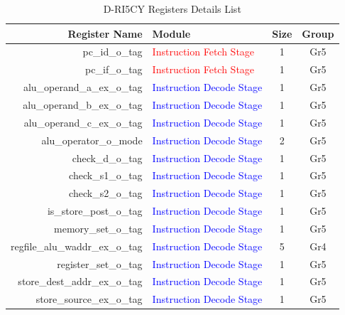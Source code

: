 \begin{table}
    \centering
    \small
    \caption{D-RI5CY Registers Details List}
    \label{tab:driscy_register_info}
    \begin{tabular}{rlcc}
        \toprule
        Register Name                   & Module                                            & Size & Group \\
        \midrule
        pc\_id\_o\_tag                  & \textcolor{red}{Instruction Fetch Stage}          & 1    & Gr5   \\
        pc\_if\_o\_tag                  & \textcolor{red}{Instruction Fetch Stage}          & 1    & Gr5   \\\hdashline
        alu\_operand\_a\_ex\_o\_tag     & \textcolor{blue}{Instruction Decode Stage}        & 1    & Gr5   \\
        alu\_operand\_b\_ex\_o\_tag     & \textcolor{blue}{Instruction Decode Stage}        & 1    & Gr5   \\
        alu\_operand\_c\_ex\_o\_tag     & \textcolor{blue}{Instruction Decode Stage}        & 1    & Gr5   \\
        alu\_operator\_o\_mode          & \textcolor{blue}{Instruction Decode Stage}        & 2    & Gr5   \\
        check\_d\_o\_tag                & \textcolor{blue}{Instruction Decode Stage}        & 1    & Gr5   \\
        check\_s1\_o\_tag               & \textcolor{blue}{Instruction Decode Stage}        & 1    & Gr5   \\
        check\_s2\_o\_tag               & \textcolor{blue}{Instruction Decode Stage}        & 1    & Gr5   \\
        is\_store\_post\_o\_tag         & \textcolor{blue}{Instruction Decode Stage}        & 1    & Gr5   \\
        memory\_set\_o\_tag             & \textcolor{blue}{Instruction Decode Stage}        & 1    & Gr5   \\
        regfile\_alu\_waddr\_ex\_o\_tag & \textcolor{blue}{Instruction Decode Stage}        & 5    & Gr4   \\
        register\_set\_o\_tag           & \textcolor{blue}{Instruction Decode Stage}        & 1    & Gr5   \\
        store\_dest\_addr\_ex\_o\_tag   & \textcolor{blue}{Instruction Decode Stage}        & 1    & Gr5   \\
        store\_source\_ex\_o\_tag       & \textcolor{blue}{Instruction Decode Stage}        & 1    & Gr5   \\

\end{tabular}
\end{table}
